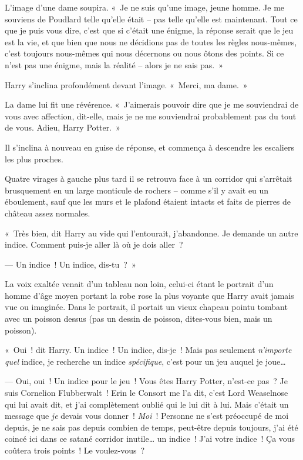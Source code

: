 L'image d'une dame soupira.
«~Je ne suis qu'une image, jeune homme.
Je me souviens de Poudlard telle qu'elle était -- pas telle qu'elle est maintenant.
Tout ce que je puis vous dire, c'est que si c'était une énigme, la réponse serait que le jeu est la vie, et que bien que nous ne décidions pas de toutes les règles nous-mêmes, c'est toujours nous-mêmes qui nous décernons ou nous ôtons des points.
Si ce n'est pas une énigme, mais la réalité -- alors je ne sais pas.~»

Harry s'inclina profondément devant l'image. «~Merci, ma dame.~»

La dame lui fit une révérence. «~J'aimerais pouvoir dire que je me souviendrai de vous avec affection, dit-elle, mais je ne me souviendrai probablement pas du tout de vous. Adieu, Harry Potter.~»

Il s'inclina à nouveau en guise de réponse, et commença à descendre les escaliers les plus proches.

Quatre virages à gauche plus tard il se retrouva face à un corridor qui s'arrêtait brusquement en un large monticule de rochers -- comme s'il y avait eu un éboulement, sauf que les murs et le plafond étaient intacts et faits de pierres de château assez normales.

«~Très bien, dit Harry au vide qui l'entourait, j'abandonne.
Je demande un autre indice.
Comment puis-je aller là où je dois aller~?

--- Un indice~! Un indice, dis-tu~?~»

La voix exaltée venait d'un tableau non loin, celui-ci étant le portrait d'un homme d'âge moyen portant la robe rose la plus voyante que Harry avait jamais vue ou imaginée. Dans le portrait, il portait un vieux chapeau pointu tombant avec un poisson dessus (pas un dessin de poisson, dites-vous bien, mais un poisson).

«~Oui~! dit Harry. Un indice~! Un indice, dis-je~! Mais pas seulement \emph{n'importe quel} indice, je recherche un indice \emph{spécifique}, c'est pour un jeu auquel je joue…

--- Oui, oui~! Un indice pour le jeu~! Vous êtes Harry Potter, n'est-ce pas~? Je suis Cornelion Flubberwalt~! Erin le Consort me l'a dit, c’est Lord Weaselnose qui lui avait dit, et j’ai complètement oublié qui le lui dit à lui. Mais c'était un message que \emph{je} devais vous donner~! \emph{Moi}~! Personne ne s'est préoccupé de moi depuis, je ne sais pas depuis combien de temps, peut-être depuis toujours, j'ai été coincé ici dans ce satané corridor inutile… un indice~! J'ai votre indice~! Ça vous coûtera trois points~! Le voulez-vous~?

